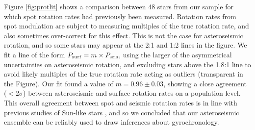 \documentclass[12pt]{article}
\begin{document}
Figure \ref{fig:protlit} shows a comparison between 48 stars from our sample for which spot  rotation rates had previously been measured. Rotation rates from spot modulation are subject to measuring multiples of the true rotation rate, and also sometimes over-correct for this effect. This is not the case for asteroseismic rotation, and so some stars may appear at the 2:1 and 1:2 lines in the figure. We fit a line of the form $P_{\rm surf} = m \times P_{\rm seis}$, using the larger of the asymmetrical uncertainties on asteroseismic rotation, and excluding stars above the 1.8:1 line to avoid likely multiples of the true rotation rate acting as outliers (transparent in the Figure). Our fit found a value of $m = 0.96 \pm 0.03$, showing a close agreement ($<2\sigma$) between asteroseismic and surface rotation rates on a population level. 
This overall agreement between spot and seismic rotation rates is in line with previous studies of Sun-like stars \cite{nielsen+2015, benomar+2015, gizon+2013, chaplin+2013}, and so we concluded that our asteroseismic ensemble can be reliably used to draw inferences about gyrochronology.\\
\end{document}
